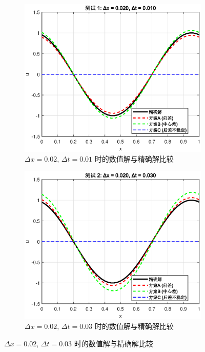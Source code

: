 \documentclass[12pt]{article}
\begin{document}
            \begin{figure}[H]
                \centering
                \begin{subfigure}[b]{0.48\textwidth}
                    \centering
                    \includegraphics[width=\textwidth]{fig/result_001.eps}
                    \caption{$\Delta x = 0.02$, $\Delta t = 0.01$ 时的数值解与精确解比较}
                \end{subfigure}
                \hfill
                \begin{subfigure}[b]{0.48\textwidth}
                    \centering
                    \includegraphics[width=\textwidth]{fig/result_003.eps}
                    \caption{$\Delta x = 0.02$, $\Delta t = 0.03$ 时的数值解与精确解比较}
                \end{subfigure}
            \end{figure}
\end{document}
